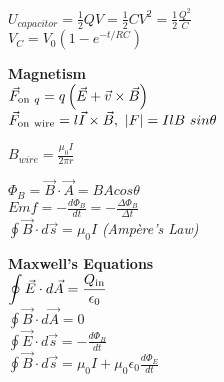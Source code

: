 \documentclass[12pt]{article}
\begin{document}
\begin{twocolumn}
\begin{flushleft}
\medskip
$\displaystyle U_{capacitor} = \frac{1}{2} Q V = \frac{1}{2} C V^2 = \frac{1}{2} \frac{Q^2}{C}$ \\
\medskip
$\displaystyle V_C = V_0(1-e^{-t/RC}) $ \\
\bigskip

{\bf Magnetism} \\
\bigskip
${\displaystyle \vec{F}_{{\rm on}\ q}=q\left(\vec{E} + \vec{v}\times\vec{B}\right)}$ \\
\medskip
$\displaystyle \vec{F}_{\rm on \ wire}=l\vec{I}\times\vec{B}, ~|F| = I l B~sin\theta $ \\
\medskip

$\displaystyle B_{wire} = \frac{\mu_0 I}{2 \pi r} $ \\
\medskip

$\displaystyle \Phi_B = \vec{B}\cdot\vec{A} = B A cos \theta  $ \\ 
\medskip
$\displaystyle Emf = - \frac{d\Phi_{B}}{dt} = -\frac{\Delta
  \Phi_B}{\Delta t} $ \\
\medskip
 ${\displaystyle \oint\vec{B}\cdot d\vec{s}=\mu_{0}I}$ {\it
   (Amp\`ere's Law)} \\ 
\bigskip

{\bf Maxwell's Equations} \\
\medskip
$\displaystyle \oint \vec{E} \cdot d\vec{A} = \frac{Q_{\rm
    in}}{\epsilon_0} $ \\  
\medskip
$\displaystyle \oint \vec{B} \cdot d\vec{A} = 0 $ \\ 
\medskip
$\displaystyle \oint \vec{E} \cdot d\vec{s} = -\frac{d\Phi_B}{dt} $
\\ 
\medskip
$\displaystyle \oint \vec{B} \cdot d\vec{s} = \mu_0 I + \mu_0
\epsilon_0 \frac{d \Phi_E}{dt} $ \\ 
\bigskip



\end{flushleft}
\end{twocolumn}
\end{document}
